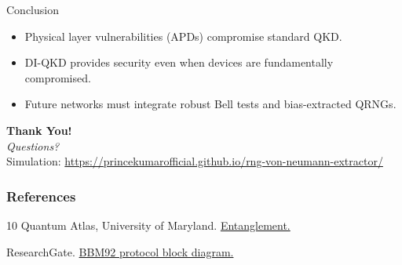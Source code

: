 \documentclass[aspectratio=169]{beamer}
\begin{document}
\begin{frame}{Conclusion}
    \begin{itemize}
        \item Physical layer vulnerabilities (APDs) compromise standard QKD.
        \item DI-QKD provides security even when devices are fundamentally compromised.
        \item Future networks must integrate robust Bell tests and bias-extracted QRNGs.
    \end{itemize}
    \vspace{0.5cm}
    \centering
    \LARGE \textbf{Thank You!} \\
    \small \textit{Questions?} \\
    \footnotesize Simulation: \href{https://princekumarofficial.github.io/rng-von-neumann-extractor/}{https://princekumarofficial.github.io/rng-von-neumann-extractor/}
\end{frame}

\begin{frame}
    \frametitle{References}
    \begin{thebibliography}{10}
        Quantum Atlas, University of Maryland.
        \newblock \href{https://quantumatlas.umd.edu/entry/entanglement/}{Entanglement.}
        
        ResearchGate.
        \newblock \href{https://www.researchgate.net/figure/The-block-diagram-of-implemented-BBM92-protocol-HWP-half-wave-plate-PBS-polarizing_fig1_360556529}{BBM92 protocol block diagram.}
    \end{thebibliography}
\end{frame}
\end{document}
